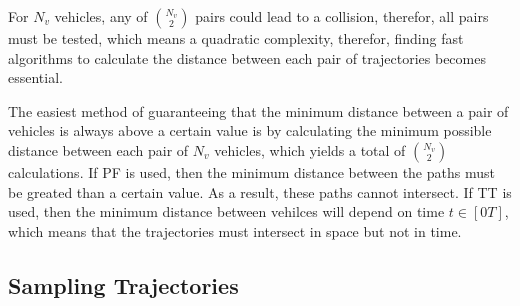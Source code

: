 \par For $N_v$ vehicles, any of ${N_v \choose 2}$ pairs could lead to a collision, therefor, all pairs must be tested, which means a quadratic complexity, therefor, finding fast algorithms to calculate the distance between each pair of trajectories becomes essential.
\par The easiest method of guaranteeing that the minimum distance between a pair of vehicles is always above a certain value is by calculating the minimum possible distance between each pair of $N_v$ vehicles, which yields a total of ${N_v \choose 2}$ calculations. If \ac{PF} is used, then the minimum distance between the paths must be greated than a certain value. As a result, these paths cannot intersect. If \ac{TT} is used, then the minimum distance between vehilces will depend on time $t \in [0 T]$, which means that the trajectories must intersect in space but not in time. 

\subsection{Sampling Trajectories}

